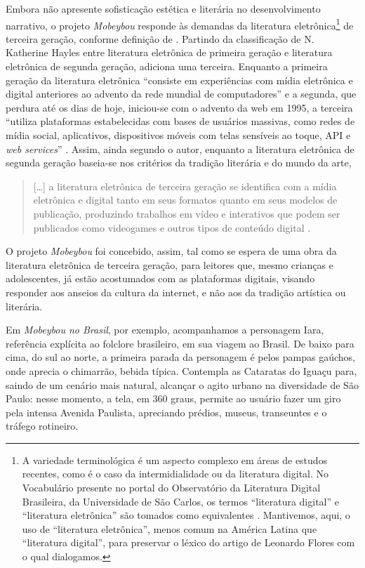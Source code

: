 \documentclass[portuguese]{textolivre}
\begin{document}
Embora não apresente sofisticação estética e literária no desenvolvimento
narrativo, o projeto \textit{Mobeybou} responde às demandas da literatura
eletrônica\footnote{
    A variedade terminológica é um aspecto complexo em áreas de
    estudos recentes, como é o caso da intermidialidade ou da literatura digital.
    No Vocabulário presente no portal do Observatório da Literatura Digital
    Brasileira, da Universidade de São Carlos, os termos “literatura digital” e
    “literatura eletrônica” são tomados como equivalentes
    \cite{antunes_literatura_2024}. Mantivemos, aqui, o uso de “literatura
    eletrônica”, menos comum na América Latina que “literatura digital”, para
    preservar o léxico do artigo de Leonardo Flores com o qual dialogamos.} 
de terceira geração, conforme definição de \textcite{flores_literatura_2021}.
Partindo da classificação de N. Katherine Hayles entre literatura eletrônica de
primeira geração e literatura eletrônica de segunda geração, \textcite{flores_literatura_2021}
adiciona uma terceira. Enquanto a primeira geração da literatura eletrônica
“consiste em experiências com mídia eletrônica e digital anteriores ao advento
da rede mundial de computadores” \cite[p. 358]{flores_literatura_2021} e a
segunda, que perdura até os dias de hoje, iniciou-se com o advento da web em
1995, a terceira “utiliza plataformas estabelecidas com bases de usuários
massivas, como redes de mídia social, aplicativos, dispositivos móveis com
telas sensíveis ao toque, API e \textit{web services}”
\cite[p.~358]{flores_literatura_2021}. Assim, ainda segundo o autor, enquanto a
literatura eletrônica de segunda geração baseia-se nos critérios da tradição
literária e do mundo da arte,
\begin{quote}
[…] a literatura eletrônica de terceira geração se identifica com a mídia
eletrônica e digital tanto em seus formatos quanto em seus modelos de
publicação, produzindo trabalhos em vídeo e interativos que podem ser
publicados como videogames e outros tipos de conteúdo digital
\cite[p.~367]{flores_literatura_2021}.
\end{quote}


O projeto \textit{Mobeybou} foi concebido, assim, tal como se espera de uma
obra da literatura eletrônica de terceira geração, para leitores que, mesmo
crianças e adolescentes, já estão acostumados com as plataformas digitais,
visando responder aos anseios da cultura da internet, e não aos da tradição
artística ou literária. 

Em \textit{Mobeybou no Brasil}, por exemplo, acompanhamos a personagem Iara,
referência explícita ao folclore brasileiro, em sua viagem ao Brasil. De baixo
para cima, do sul ao norte, a primeira parada da personagem é pelos pampas
gaúchos, onde aprecia o chimarrão, bebida típica. Contempla as Cataratas do
Iguaçu para, saindo de um cenário mais natural, alcançar o agito urbano na
diversidade de São Paulo: nesse momento, a tela, em 360 graus, permite ao
usuário fazer um giro pela intensa Avenida Paulista, apreciando prédios,
museus, transeuntes e o tráfego rotineiro. 
\end{document}
